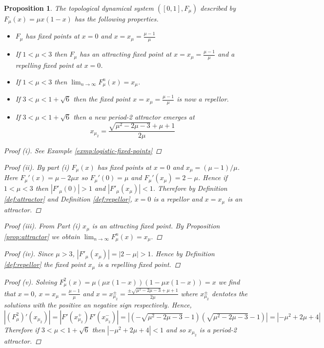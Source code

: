 \documentclass[11pt,a4paper,oneside]{memoir}
\theoremstyle{plain}
\newtheorem{prop}[thm]{Proposition}
\theoremstyle{definition}
\begin{document}
\begin{prop} \label{prop:logistic-properties}
    The topological dynamical system $([0,1], F_{\mu})$ described by $F_\mu(x) = \mu x (1-x)$ has the following properties.
    \begin{itemize}
        \item[(i)]$F_\mu$ has fixed points at $x = 0$ and $x = x_{\mu} = \frac{\mu - 1}{\mu}$
        \item[(ii)] If $1 < \mu < 3$ then $F_\mu$ has an attracting fixed point at $x = x_\mu = \frac{\mu - 1}{\mu}$ and a repelling fixed point at $x = 0$.
        \item[(iii)] If $1 < \mu < 3$ then $\lim_{n \to \infty} F_\mu^n(x) = x_\mu$.
        \item[(iv)] If $3 < \mu < 1 + \sqrt{6}$ then the fixed point $x = x_\mu = \frac{\mu - 1}{\mu}$ is now a repellor.
        \item[(v)] If $3 < \mu < 1 + \sqrt{6}$ then a new period-2 attractor emerges at \[x_{\mu_2} = \frac{\sqrt{\mu^2 - 2\mu - 3} + \mu + 1}{2\mu}\] 
    \end{itemize}
    \begin{proof}[Proof (i)]
        See Example \ref{exmp:logistic-fixed-points}
    \end{proof}
    \begin{proof}[Proof (ii)]
        By part (i) $F_\mu(x)$ has fixed points at $x = 0$ and $x_\mu = (\mu - 1) / \mu$. Here $F_\mu'(x) = \mu - 2\mu x$ so $F_\mu'(0) = \mu$ and $F_\mu'(x_\mu) = 2 - \mu$. Hence if $1 < \mu < 3$ then $|F'_\mu(0)| > 1$ and $|F'_\mu(x_\mu)| < 1$. Therefore by Definition \ref{def:attractor} and Definition \ref{def:repellor}, $x = 0$ is a repellor and $x = x_\mu$ is an attractor.
    \end{proof}
    \begin{proof}[Proof (iii)]
        From Part (i) $x_\mu$ is an attracting fixed point. By Proposition \ref{prop:attractor} we obtain $\lim_{n \to \infty}F_\mu^n(x) = x_\mu.$
    \end{proof}
    \begin{proof}[Proof (iv)]
        Since $\mu > 3$, $|F'_\mu(x_\mu)| = |2-\mu| > 1$. Hence by Definition \ref{def:repellor} the fixed point $x_\mu$ is a repelling fixed point.
    \end{proof}
    \begin{proof}[Proof (v)]
        Solving $F^2_\mu(x) = \mu(\mu x(1-x))(1-\mu x(1-x)) = x$ we find that $x = 0$, $x = x_\mu = \frac{\mu - 1}{\mu}$ and $x = x^\pm_{\mu_2} = \frac{\pm\sqrt{\mu^2 - 2\mu - 3} + \mu + 1}{2\mu}$ where $x^\pm_{\mu_2}$ dentotes the solutions with the positive an negative sign respectively. Hence, $ \left\lvert (F_\mu^2)'(x_{\mu_2})\right\rvert = \left\lvert F'(x^+_{\mu_2}) F'(x^-_{\mu_2}) \right\rvert = \left\lvert \left( - \sqrt{\mu^2 - 2\mu - 3} - 1 \right) \left( \sqrt{\mu^2 - 2\mu - 3} - 1\right) \right\rvert = \left\lvert -\mu^2 + 2\mu + 4 \right\rvert $
        Therefore if $3 < \mu < 1 + \sqrt{6}$ then $\left\lvert -\mu^2 + 2\mu + 4 \right\rvert < 1$ and so $x_{\mu_2}$ is a period-2 attractor.
    \end{proof}
\end{prop}
\end{document}
